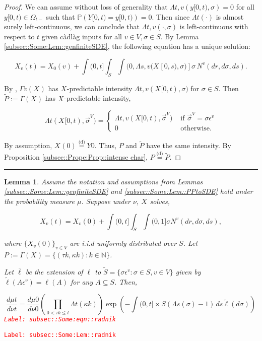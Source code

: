 \documentclass[12pt]{article}
\newcommand{\mb}{\mathbb}
\newcommand{\ov}{\overline}
\newcommand{\te}{\text}
\newcommand{\ep}{\epsilon}
\newcommand{\tr}{\textcolor{red}}
\newcommand{\labe}[1]{\tr{\texttt{Label: #1}}}
\newcommand{\ind}{\hspace{24pt}}
\newcommand{\lin}{\rule{\linewidth}{0.4 pt}}
\newcommand{\pr}{\mb{P}}							%
\newcommand{\deq}{\overset{\text{(d)}}{=}}			%
\newcommand{\defeq}{:=}								%
\renewcommand{\v}{v}							%
\renewcommand{\S}{S}							%
\newcommand{\s}{\sigma}							%
\newcommand{\sv}{\vec{\s}}						%
\newcommand{\ev}{\ep}							%
\renewcommand{\t}{t}							%
\newcommand{\sset}{\Omega}						%
\renewcommand{\tt}{s}							%
\newcommand{\X}{X}								%
\newcommand{\vind}[1]{^{#1}}					%
\newcommand{\vsi}[1]{^{#1}}						%
\newcommand{\cind}[1]{_{#1}}					%
\newcommand{\tp}[1]{(#1)}						%
\newcommand{\tip}[1]{#1}						%
\newcommand{\ts}[1]{_{#1}}						%
\newcommand{\poiss}{N}							%
\newcommand{\Sm}{\ell}							%
\renewcommand{\r}{r}							%
\newcommand{\alt}[1]{\widetilde{#1}}			%
\newcommand{\m}{\mu}							%
\newcommand{\mm}{\nu}							%
\newcommand{\XX}{Y}								%
\newcommand{\rt}{\tau}							%
\renewcommand{\it}{k}							%
\newcommand{\pmap}{\Gamma}						%
\renewcommand{\mark}{\kappa}					%
\newcommand{\rp}{P}								%
\newcommand{\typset}{A}							%
\newcommand{\ratee}{\Lambda}					%
\newcommand{\xx}{y}								%
\newtheorem{lem}[thms]{Lemma}
\begin{document}
\begin{proof}

We can assume without loss of generality that \(\ratee{\t,\v}(\xx{}{[0,\t)},\s) = 0\) for all \(\xx{}{[0,\t)}\in \sset\vsi{}\ts{\t-}\) such that \(\pr(\XX{}{[0,\t)} = \xx{}{[0,\t)}) = 0\). Then since \(\ratee{\t}(\cdot)\) is almost surely left-continuous, we can conclude that \(\ratee{\t,\v}(\cdot,\s)\) is left-continuous with respect to \(\t\) given c\`adl\`ag inputs for all \(\v\in V,\s\in\S\). By Lemma \ref{subsec::Some:Lem::genfiniteSDE}, the following equation has a unique solution:

\[\X\cind{\v}\tp{\t} = \X\cind{0}\tp{\v} + \int{(0,\t]}\int_\S\int{(0,\ratee{\tt,\v}(\X\cind{}\tip{[0,\tt)},\s)]}  \s\,\poiss\vind{\v}(d\r,d\s,d\tt).\]

By \cite[Exercise 14.7.1]{DalVer08}, \(\pmap{\v}(\X\cind{}\tip{})\) has \(\X\cind{}\tip{}\)-predictable intensity \(\ratee{\t,\v}(\X\cind{}\tip{[0,\t)},\s)\) for \(\s \in \S\). Then \(\alt{\rp{}} \defeq \pmap{}(\X\cind{}\tip{})\) has \(\X\cind{}\tip{}\)-predictable intensity,

\[\ratee{\t}(\X\cind{}\tip{[0,\t)},\sv\cind{}\vsi{V}) = \begin{cases}
\ratee{\t,\v}(\X\cind{}\tip{[0,\t)},\sv\cind{}\vsi{V}) &\te{ if } \sv\cind{}\vsi{V} = \s\ev\vind{\v}\\
0&\te{ otherwise.}
\end{cases}\]

By assumption, \(\X\cind{}\tp{0} \deq \XX{}{0}\). Thus, \(\rp{}\) and \(\alt{\rp{}}\) have the same intensity. By Proposition \ref{subsec::Prope:Prop::intense char}, \(\rp{} \deq \alt{\rp{}}\).
\end{proof}
\lin

\begin{lem}
Assume the notation and assumptions from Lemmas \ref{subsec::Some:Lem::genfiniteSDE} and \ref{subsec::Some:Lem::PPtoSDE} hold under the probability measure \(\m{}{}{}\). Suppose under \(\mm{}{}{}\), \(\X\cind{}\tip{}\) solves,

\[\X\cind{\v}\tp{\t} = \X\cind{\v}\tp{0} +\int{(0,\t]}\int_\S\int{(0,1]} \s \poiss\vind{\v}(d\r,d\s,d\tt),\]

where \(\{\X\cind{\v}\tp{0}\}_{\v \in V}\) are i.i.d uniformly distributed over \(\S\). Let \(\rp{} \defeq \pmap{}(\X\cind{}\tip{}) = \{(\rt{\it},\mark{\it}):\it\in \mb{N}\}\).

\ind Let \(\ov{\ell}\) be the extension of \(\Sm\) to \(\alt{\S} = \{\s\ev\vind{\v}: \s \in \S, \v \in V\}\) given by \(\alt{\Sm}(\typset\ev\vind{\v}) = \Sm(\typset)\) for any \(\typset \subseteq \S\). Then,

\begin{equation}
\frac{d\m{}{\t}{}}{d\mm{}{\t}{}}= \frac{d\m{}{0}{}}{d\mm{}{0}{}}\left(\prod_{0< \rt{\it}\leq \t} \ratee{\t}(\mark{\it})\right)\exp\left(-\int{(0,\t]\times \S} (\ratee{\tt}(\s) - 1)\,d\tt\alt{\Sm}(d\s)\right)
\label{subsec::Some:eqn::radnik}
\end{equation}
\labe{subsec::Some:eqn::radnik}
\label{subsec::Some:Lem::radnik}
\end{lem}
\labe{subsec::Some:Lem::radnik}
\end{document}
